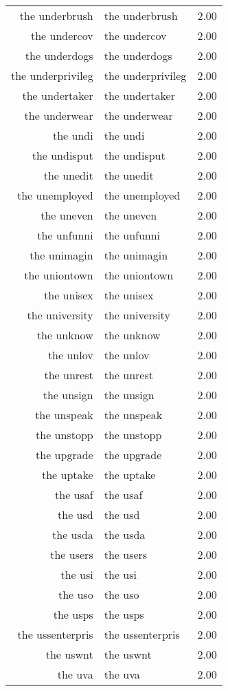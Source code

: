 \begin{table}[ht]
\begin{tabular}{rlr}
  the underbrush & the underbrush & 2.00 \\ 
  the undercov & the undercov & 2.00 \\ 
  the underdogs & the underdogs & 2.00 \\ 
  the underprivileg & the underprivileg & 2.00 \\ 
  the undertaker & the undertaker & 2.00 \\ 
  the underwear & the underwear & 2.00 \\ 
  the undi & the undi & 2.00 \\ 
  the undisput & the undisput & 2.00 \\ 
  the unedit & the unedit & 2.00 \\ 
  the unemployed & the unemployed & 2.00 \\ 
  the uneven & the uneven & 2.00 \\ 
  the unfunni & the unfunni & 2.00 \\ 
  the unimagin & the unimagin & 2.00 \\ 
  the uniontown & the uniontown & 2.00 \\ 
  the unisex & the unisex & 2.00 \\ 
  the university & the university & 2.00 \\ 
  the unknow & the unknow & 2.00 \\ 
  the unlov & the unlov & 2.00 \\ 
  the unrest & the unrest & 2.00 \\ 
  the unsign & the unsign & 2.00 \\ 
  the unspeak & the unspeak & 2.00 \\ 
  the unstopp & the unstopp & 2.00 \\ 
  the upgrade & the upgrade & 2.00 \\ 
  the uptake & the uptake & 2.00 \\ 
  the usaf & the usaf & 2.00 \\ 
  the usd & the usd & 2.00 \\ 
  the usda & the usda & 2.00 \\ 
  the users & the users & 2.00 \\ 
  the usi & the usi & 2.00 \\ 
  the uso & the uso & 2.00 \\ 
  the usps & the usps & 2.00 \\ 
  the ussenterpris & the ussenterpris & 2.00 \\ 
  the uswnt & the uswnt & 2.00 \\ 
  the uva & the uva & 2.00 \\ 

\end{tabular}
\end{table}
